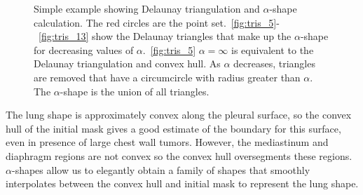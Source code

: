 \documentclass{llncs}
\begin{document}
\begin{figure}[ht!]
  \centering
  \caption{Simple example showing Delaunay triangulation and $\alpha$-shape calculation. The red circles are the point set.~\ref{fig:tris_5}-~\ref{fig:tris_13} show the Delaunay triangles that make up the $\alpha$-shape for decreasing values of $\alpha$.~\ref{fig:tris_5} $\alpha=\infty$ is equivalent to the Delaunay triangulation and convex hull. As $\alpha$ decreases, triangles are removed that have a circumcircle with radius greater than $\alpha$. The $\alpha$-shape is the union of all triangles.}
  \label{fig:star}
\end{figure}

The lung shape is approximately convex along the pleural surface, so the convex hull of the initial mask gives a good estimate of the boundary for this surface, even in presence of large chest wall tumors. However, the mediastinum and diaphragm regions are not convex so the convex hull oversegments these regions. $\alpha$-shapes allow us to elegantly obtain a family of shapes that smoothly interpolates between the convex hull and initial mask to represent the lung shape. 
\end{document}
